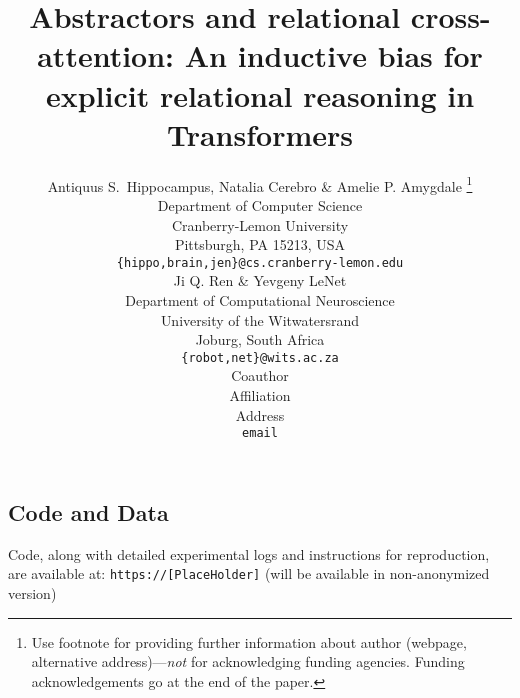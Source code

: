 \documentclass{article}
\title{Abstractors and relational cross-attention: An inductive bias for explicit relational reasoning in Transformers}
\author{Antiquus S.~Hippocampus, Natalia Cerebro \& Amelie P. Amygdale \thanks{ Use footnote for providing further information
about author (webpage, alternative address)---\emph{not} for acknowledging
funding agencies.  Funding acknowledgements go at the end of the paper.} \\
Department of Computer Science\\
Cranberry-Lemon University\\
Pittsburgh, PA 15213, USA \\
\texttt{\{hippo,brain,jen\}@cs.cranberry-lemon.edu} \\
\And
Ji Q. Ren \& Yevgeny LeNet \\
Department of Computational Neuroscience \\
University of the Witwatersrand \\
Joburg, South Africa \\
\texttt{\{robot,net\}@wits.ac.za} \\
\AND
Coauthor \\
Affiliation \\
Address \\
\texttt{email}
}
\begin{document}
\maketitle






% 
% 



\subsection*{Code and Data}
Code, along with detailed experimental logs and instructions for reproduction, are available at: \texttt{https://[PlaceHolder]} (will be available in non-anonymized version)

\medskip

{%

% 


}

\clearpage
\appendix



% 
% 
% 
\end{document}
